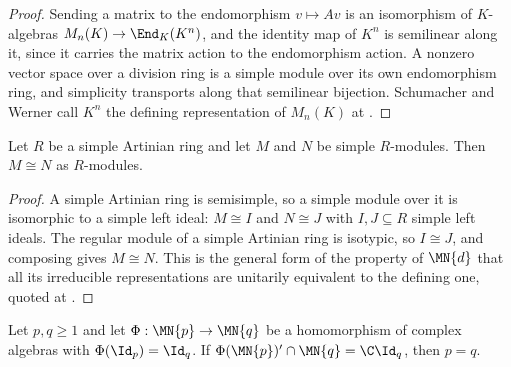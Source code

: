 \begin{proof}\leanok
    Sending a matrix to the endomorphism $v\mapsto Av$ is an isomorphism of
    $K$-algebras $M_n(K)\to\End_{K}(K^n)$, and the identity map of $K^n$ is
    semilinear along it, since it carries the matrix action to the
    endomorphism action.  A nonzero vector space over a division ring is a
    simple module over its own endomorphism ring, and simplicity transports
    along that semilinear bijection.  Schumacher and Werner call $K^n$ the
    defining representation of $M_n(K)$ at
    \cite[lines~2112--2114]{SchumacherWerner2004QCA}.
\end{proof}

\begin{lemma}
    \label{lem:matalg_simple_module_unique}
    \leanok
    Let $R$ be a simple Artinian ring and let $M$ and $N$ be simple
    $R$-modules.  Then $M\cong N$ as $R$-modules.
\end{lemma}

\begin{proof}\leanok
    A simple Artinian ring is semisimple, so a simple module over it is
    isomorphic to a simple left ideal: $M\cong I$ and $N\cong J$ with
    $I,J\subseteq R$ simple left ideals.  The regular module of a simple
    Artinian ring is isotypic, so $I\cong J$, and composing gives
    $M\cong N$.  This is the general form of the property of $\MN{d}$ that
    all its irreducible representations are unitarily equivalent to the
    defining one, quoted at
    \cite[lines~2112--2114]{SchumacherWerner2004QCA}.
\end{proof}

\begin{theorem}
    \label{thm:matalg_size_eq}
    \leanok
    Let $p,q\geq1$ and let $\Phi:\MN{p}\to\MN{q}$ be a homomorphism of
    complex algebras with $\Phi(\Id_p)=\Id_q$.  If
    $\Phi(\MN{p})^{\prime}\cap\MN{q}=\C\Id_q$, then $p=q$.
\end{theorem}

